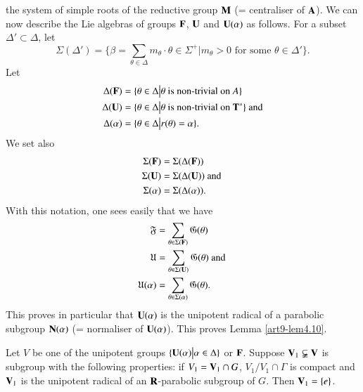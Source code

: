 the system  of simple roots of the reductive group $\mathbf{M}$ (= centraliser of $\mathbf{A}$). We can now describe the Lie algebras of groups $\mathbf{F}$, $\mathbf{U}$ and $\mathbf{U} (\alpha)$ as follows. For a subset $\Delta' \subset \Delta$, let
$$
\Sigma (\Delta') = \{\beta = \sum\limits_{\theta \in \Delta} m_\theta  \cdot \theta \in \Sigma^+ \big| m_\theta > 0 \text{ for some } \theta \in \Delta'\}.
$$
Let 
\begin{align*}
\Delta (\mathbf{F}) & = \{\theta \in \Delta \big| \theta \text{ is non-trivial on } A \}\\
\Delta (\mathbf{U}) & = \{\theta \in \Delta \big| \theta \text{ is non-trivial on } \mathbf{T}^\ast\} \text{ and} \\
\Delta (\alpha) & = \{\theta \in \Delta \big| r (\theta) = \alpha \}.
\end{align*}
We set also 
\begin{align*}
\Sigma(\mathbf{F}) & = \Sigma (\Delta (\mathbf{F}))\\
\Sigma (\mathbf{U}) & = \Sigma (\Delta (\mathbf{U})) \text{ and }\\
\Sigma (\alpha) & = \Sigma (\Delta (\alpha)).
\end{align*}
With this notation, one sees easily that we have
\begin{align*}
\mathfrak{F} & = \sum\limits_{\theta \in \Sigma (\mathbf{F})} \mathfrak{G} (\theta) \\
\mathfrak{U} & = \sum\limits_{\theta \in \Sigma (\mathbf{U})} \mathfrak{G} (\theta) \text{ and }\\
\mathfrak{U}(\alpha) & =  \sum\limits_{\theta \in \Sigma (\alpha)} \mathfrak{G} (\theta).
\end{align*}
This proves in particular that $\mathbf{U}(\alpha)$ is the unipotent radical of a parabolic subgroup $\mathbf{N} (\alpha)$ (= normaliser of $\mathbf{U} (\alpha)$). This proves Lemma \ref{art9-lem4.10}.

\begin{lemma}\label{art9-lem4.12}
Let $V$ be one of the unipotent groups $\{\mathbf{U} (\alpha) \big| \alpha \in \Delta\}$ or $\mathbf{F}$. Suppose $\mathbf{V}_1 \varsubsetneqq \mathbf{V}$ is subgroup with the following properties: if $V_1 =\mathbf{V}_1 \cap G$, $V_1 / V_1 \cap \Gamma$ is compact and  $\mathbf{V}_1$ is the unipotent radical of an $\mathbf{R}$-parabolic subgroup of $G$. Then $\mathbf{V}_1 = \{e\}$.
\end{lemma}

